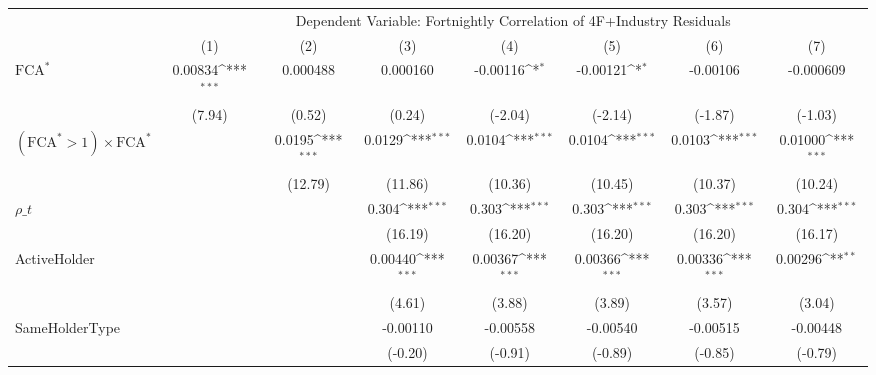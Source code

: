 {
\def\sym#1{\ifmmode^{#1}\else\(^{#1}\)\fi}
\begin{tabular}{l*{7}{c}}
\hline\hline
 & \multicolumn{7}{c}{Dependent Variable: Fortnightly Correlation of 4F+Industry Residuals}                 \\
 \cline{2-8}
                    &\multicolumn{1}{c}{(1)}         &\multicolumn{1}{c}{(2)}         &\multicolumn{1}{c}{(3)}         &\multicolumn{1}{c}{(4)}         &\multicolumn{1}{c}{(5)}         &\multicolumn{1}{c}{(6)}         &\multicolumn{1}{c}{(7)}         \\
\hline
$ \text{FCA}^* $    &     0.00834\sym{***}&    0.000488         &    0.000160         &    -0.00116\sym{*}  &    -0.00121\sym{*}  &    -0.00106         &   -0.000609         \\
                    &      (7.94)         &      (0.52)         &      (0.24)         &     (-2.04)         &     (-2.14)         &     (-1.87)         &     (-1.03)         \\
[1em]
 $ (\text{FCA}^* > 1) \times {\text{FCA} ^*}  $ &                     &      0.0195\sym{***}&      0.0129\sym{***}&      0.0104\sym{***}&      0.0104\sym{***}&      0.0103\sym{***}&     0.01000\sym{***}\\
                    &                     &     (12.79)         &     (11.86)         &     (10.36)         &     (10.45)         &     (10.37)         &     (10.24)         \\
[1em]
$ \rho\_t $          &                     &                     &       0.304\sym{***}&       0.303\sym{***}&       0.303\sym{***}&       0.303\sym{***}&       0.304\sym{***}\\
                    &                     &                     &     (16.19)         &     (16.20)         &     (16.20)         &     (16.20)         &     (16.17)         \\
[1em]
ActiveHolder        &                     &                     &     0.00440\sym{***}&     0.00367\sym{***}&     0.00366\sym{***}&     0.00336\sym{***}&     0.00296\sym{**} \\
                    &                     &                     &      (4.61)         &      (3.88)         &      (3.89)         &      (3.57)         &      (3.04)         \\
[1em]
SameHolderType      &                     &                     &    -0.00110         &    -0.00558         &    -0.00540         &    -0.00515         &    -0.00448         \\
                    &                     &                     &     (-0.20)         &     (-0.91)         &     (-0.89)         &     (-0.85)         &     (-0.79)         \\

\end{tabular}}
